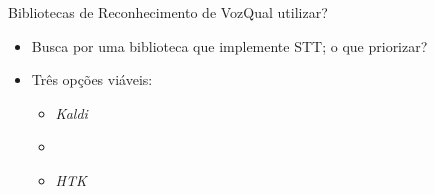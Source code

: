 \begin{frame}{Bibliotecas de Reconhecimento de Voz}{Qual utilizar?}

\begin{itemize}
\item Busca por uma biblioteca que implemente STT; o que priorizar?


\item<3-> Três opções viáveis:
\begin{itemize}
  \item \textit{Kaldi}
  \item {}
   
  \item \textit{HTK}
\end{itemize}

\end{itemize}
\end{frame}
